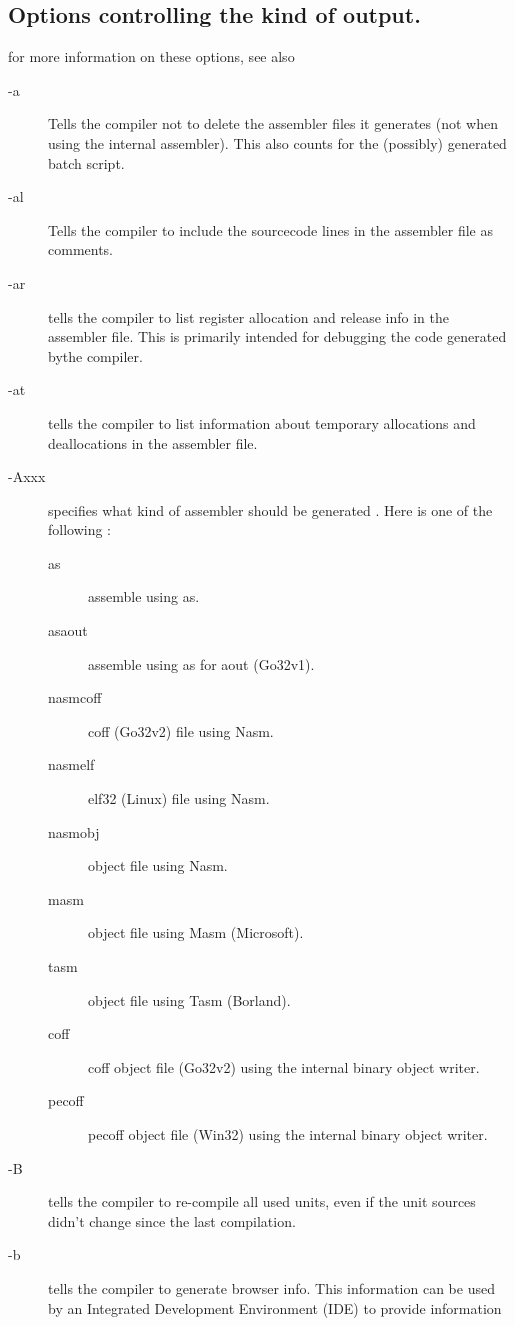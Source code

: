 \documentclass{report}
\begin{document}
\subsection{Options controlling the kind of output.}
for more information on these options, see also \progref
\begin{description}
\item [-a]  Tells the compiler not to delete the assembler files
it generates (not when using the internal assembler).
This also counts for the (possibly) generated batch script.
\item [-al]  Tells the compiler to include the sourcecode lines
in the assembler file as comments.
\item[-ar]  tells the compiler to list register allocation and
release info in the assembler file. This is primarily intended for debugging
the code generated bythe compiler.
\item[-at]  tells the compiler to list information about
temporary allocations and deallocations in the assembler file.
\item [-Axxx]  specifies what kind of assembler should be generated . Here
 is one of the following :
\begin{description}
\item[as] assemble using \gnu as.
\item[asaout] assemble using \gnu as for aout (Go32v1).
\item[nasmcoff] coff (Go32v2) file using Nasm.
\item[nasmelf] elf32 (Linux) file using Nasm.
\item[nasmobj] object file using Nasm.
\item[masm] object file using Masm (Microsoft).
\item[tasm] object file using Tasm (Borland).
\item[coff] coff object file (Go32v2) using the internal binary object writer.
\item[pecoff] pecoff object file (Win32) using the internal binary object writer.
\end{description}
\item[-B]  tells the compiler to re-compile all used units, even
if the unit sources didn't change since the last compilation.
\item[-b]  tells the compiler to generate browser info. This information can
be used by an Integrated Development Environment (IDE) to provide information

\end{description}
\end{document}
